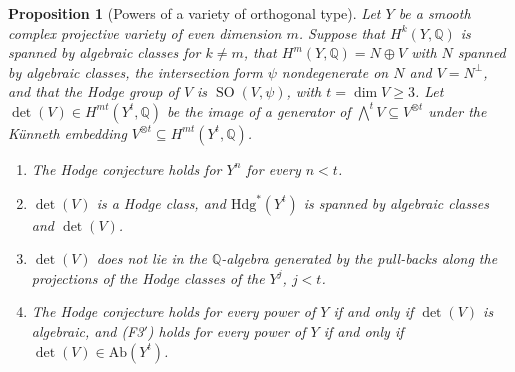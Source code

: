 \documentclass[11pt,reqno]{amsart}
\theoremstyle{plain}
\newtheorem{proposition}[theorem]{Proposition}
\theoremstyle{definition}
\theoremstyle{remark}
\newcommand{\QQ}{\mathbb{Q}}
\newcommand{\Hdg}{\mathrm{Hdg}}
\DeclareMathOperator{\SO}{SO}
\begin{document}
\begin{proposition}[Powers of a variety of orthogonal type]
\label{prop:orthpowers}
Let $Y$ be a smooth complex projective variety of even dimension $m$. Suppose
that $H^{k}(Y,\QQ)$ is spanned by algebraic classes for $k\ne m$, that
$H^{m}(Y,\QQ)=N\oplus V$ with $N$ spanned by algebraic classes, the
intersection form $\psi$ nondegenerate on $N$ and $V=N^{\perp}$, and that the
Hodge group of $V$ is $\SO(V,\psi)$, with $t=\dim V\ge3$. Let
$\det(V)\in H^{mt}(Y^{t},\QQ)$ be the image of a generator of
$\bigwedge^{t}V\subseteq V^{\otimes t}$ under the K\"unneth embedding
$V^{\otimes t}\subseteq H^{mt}(Y^{t},\QQ)$.
\begin{enumerate}[label=\textup{(\roman*)},leftmargin=2.6em,itemsep=2pt]
\item The Hodge conjecture holds for $Y^{n}$ for every $n<t$.
\item $\det(V)$ is a Hodge class, and $\Hdg^{*}(Y^{t})$ is spanned by
  algebraic classes and $\det(V)$.
\item $\det(V)$ does not lie in the $\QQ$-algebra generated by the pull-backs
  along the projections of the Hodge classes of the $Y^{j}$, $j<t$.
\item The Hodge conjecture holds for every power of $Y$ if and only if
  $\det(V)$ is algebraic, and \textup{(F3$'$)} holds for every power of $Y$
  if and only if $\det(V)\in\mathrm{Ab}(Y^{t})$.
\end{enumerate}
\end{proposition}
\end{document}
